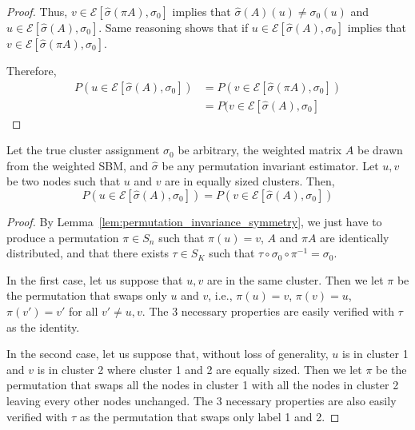 \documentclass{article}
\begin{document}
\begin{proof}
Thus, $v \in \mathcal{E}[ \hat{\sigma}(\pi A), \sigma_0]$ implies that $\hat{\sigma}(A)(u) \neq \sigma_0(u)$ and $u \in \mathcal{E}[ \hat{\sigma}(A), \sigma_0]$. 
Same reasoning shows that if $u \in \mathcal{E}[ \hat{\sigma}(A), \sigma_0]$ implies that $v \in \mathcal{E}[\hat{\sigma}(\pi A), \sigma_0]$.

Therefore, 
\begin{align*}
P( u \in \mathcal{E}[\hat{\sigma}(A), \sigma_0] ) &= P( v \in \mathcal{E}[ \hat{\sigma}(\pi A), \sigma_0] ) \\
     &= P( v \in \mathcal{E}[\hat{\sigma}(A), \sigma_0] 
\end{align*}

\end{proof}


\begin{corollary}
\label{cor:permutation_invariance_symmetry_sbm}

Let the true cluster assignment $\sigma_0$ be arbitrary, the weighted matrix $A$ be drawn from the weighted SBM, and $\hat{\sigma}$ be any permutation invariant estimator. Let $u,v$ be two nodes such that $u$ and $v$ are in equally sized clusters. Then,
\[
P( u \in \mathcal{E}[\hat{\sigma}(A), \sigma_0]) = P( v \in \mathcal{E}[\hat{\sigma}(A), \sigma_0] )
\]
\end{corollary}

\begin{proof}

By Lemma~\ref{lem:permutation_invariance_symmetry}, we just have to produce a permutation $\pi \in S_n$ such that $\pi(u) = v$, $A$ and $\pi A$ are identically distributed, and that there exists $\tau \in S_K$ such that $\tau \circ \sigma_0 \circ \pi^{-1} = \sigma_0$.

In the first case, let us suppose that $u, v$ are in the same cluster. Then we let $\pi$ be the permutation that swaps only $u$ and $v$, i.e., $\pi(u) = v$, $\pi(v) = u$, $\pi(v') = v'$ for all $v' \neq u,v$. The 3 necessary properties are easily verified with $\tau$ as the identity.

In the second case, let us suppose that, without loss of generality, $u$ is in cluster 1 and $v$ is in cluster 2 where cluster 1 and 2 are equally sized. Then we let $\pi$ be the permutation that swaps all the nodes in cluster 1 with all the nodes in cluster 2 leaving every other nodes unchanged. The 3 necessary properties are also easily verified with $\tau$ as the permutation that swaps only label 1 and 2. 

\end{proof}
\end{document}
